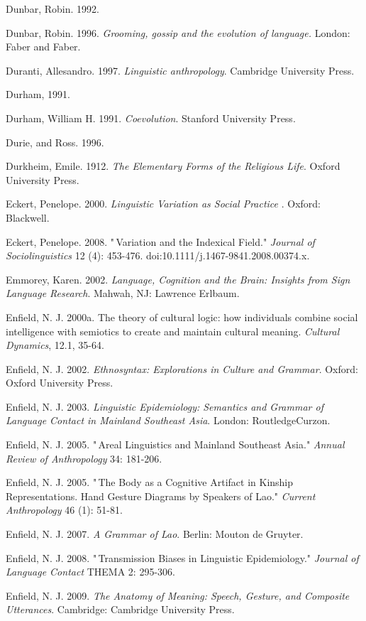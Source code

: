Dunbar, Robin. 1992.

Dunbar, Robin. 1996. \textit{Grooming, gossip and the evolution of 
language.} London: Faber and Faber.

Duranti, Allesandro. 1997. \textit{Linguistic anthropology}. 
Cambridge University Press.

Durham, 1991.

Durham, William H. 1991. \textit{Coevolution}. Stanford University 
Press.

Durie, and Ross. 1996.

Durkheim, Emile. 1912. \textit{The Elementary Forms of the Religious 
Life}. Oxford University Press.

Eckert, Penelope. 2000. \textit{Linguistic Variation as Social Practice
}. Oxford: Blackwell.

Eckert, Penelope. 2008. "\,Variation and the Indexical Field." \textit{
Journal of Sociolinguistics} 12 (4): 453-476. 
doi:10.1111/j.1467-9841.2008.00374.x.

Emmorey, Karen. 2002. \textit{Language, Cognition and the Brain: 
Insights from Sign Language Research}. Mahwah, NJ: Lawrence Erlbaum.

Enfield, N. J. 2000a. The theory of cultural logic: how individuals 
combine social intelligence with semiotics to create and maintain 
cultural meaning. \textit{Cultural Dynamics}, 12.1, 35-64.

Enfield, N. J. 2002. \textit{Ethnosyntax: Explorations in Culture and 
Grammar}. Oxford: Oxford University Press.

Enfield, N. J. 2003. \textit{Linguistic Epidemiology: Semantics and 
Grammar of Language Contact in Mainland Southeast Asia}. London: 
RoutledgeCurzon.

Enfield, N. J. 2005. "\,Areal Linguistics and Mainland Southeast Asia." 
\textit{Annual Review of Anthropology} 34: 181-206.

Enfield, N. J. 2005. "\,The Body as a Cognitive Artifact in Kinship 
Representations. Hand Gesture Diagrams by Speakers of Lao." \textit{
Current Anthropology} 46 (1): 51-81.

Enfield, N. J. 2007. \textit{A Grammar of Lao}. Berlin: Mouton de 
Gruyter.

Enfield, N. J. 2008. "\,Transmission Biases in Linguistic Epidemiology." 
\textit{Journal of Language Contact} THEMA 2: 295-306.

Enfield, N. J. 2009. \textit{The Anatomy of Meaning: Speech, Gesture, 
and Composite Utterances}. Cambridge: Cambridge University Press.

